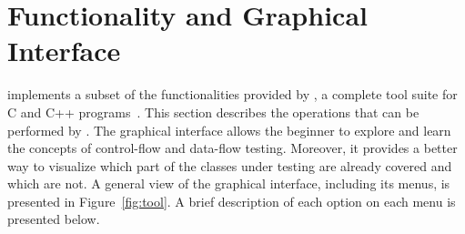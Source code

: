 \section{\toolname Functionality and Graphical
Interface}\label{sec:tool}

\toolname implements a subset of the functionalities provided by
\xSuds, a complete tool suite for C and C++
programs~\cite{Agrawal98MSTA}. This section describes the
operations that can be performed by \toolname. The graphical
interface allows the beginner to explore and learn the concepts of
control-flow and data-flow testing. Moreover, it provides a better
way to visualize which part of the classes under testing are
already covered and which are not. A general view of the \toolname
graphical interface, including its menus, is presented in
Figure~\ref{fig:tool}. A brief description of each option on each
menu is presented below.



